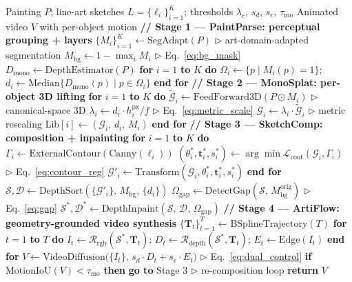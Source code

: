 \begin{algorithm}[t]
\caption{Canvas3D Pipeline}
\label{alg:canvas3d}
{\footnotesize
\begin{algorithmic}[1]
\REQUIRE Painting $P$; line-art sketches $L=\{\ell_i\}_{i=1}^{K}$;
         thresholds $\lambda_c$, $s_d$, $s_e$, $\tau_\text{mo}$
\ENSURE Animated video $V$ with per-object motion
\medskip
\STATE \textbf{// Stage 1 --- PaintParse: perceptual grouping + layers}
\STATE $\{M_i\}_{i=1}^{K} \gets \text{SegAdapt}(P)$
    \hfill $\triangleright$ art-domain-adapted segmentation
\STATE $M_\text{bg} \gets 1 - \max_i M_i$
    \hfill $\triangleright$ Eq.~\ref{eq:bg_mask}
\STATE $D_\text{mono} \gets \text{DepthEstimator}(P)$
\STATE \textbf{for} $i = 1$ \textbf{to} $K$ \textbf{do}
\STATE \quad $\Omega_i \gets \{p \mid M_i(p){=}1\}$;
    $d_i \gets \text{Median}\{D_\text{mono}(p) \mid p \in \Omega_i\}$
\STATE \textbf{end for}
\medskip
\STATE \textbf{// Stage 2 --- MonoSplat: per-object 3D lifting}
\STATE \textbf{for} $i = 1$ \textbf{to} $K$ \textbf{do}
\STATE \quad $\widetilde{\mathcal{G}}_i \gets
    \text{FeedForward3D}(P \odot M_i)$
    \hfill $\triangleright$ canonical-space 3D
\STATE \quad $\lambda_i \gets d_i \cdot h_i^\text{px}/f$
    \hfill $\triangleright$ Eq.~\ref{eq:metric_scale}
\STATE \quad $\mathcal{G}_i \gets \lambda_i \cdot \widetilde{\mathcal{G}}_i$
    \hfill $\triangleright$ metric rescaling
\STATE \quad $\text{Lib}[i] \gets (\mathcal{G}_i,\, d_i,\, M_i)$
\STATE \textbf{end for}
\medskip
\STATE \textbf{// Stage 3 --- SketchComp: composition + inpainting}
\STATE \textbf{for} $i = 1$ \textbf{to} $K$ \textbf{do}
\STATE \quad $\Gamma_i \gets \text{ExternalContour}(\text{Canny}(\ell_i))$
\STATE \quad $(\theta_i^*,\mathbf{t}_i^*,s_i^*) \gets
    \arg\min \mathcal{L}_\text{cont}(\mathcal{G}_i,\Gamma_i)$
    \hfill $\triangleright$ Eq.~\ref{eq:contour_reg}
\STATE \quad $\mathcal{G}'_i \gets
    \text{Transform}(\mathcal{G}_i,\theta_i^*,\mathbf{t}_i^*,s_i^*)$
\STATE \textbf{end for}
\STATE $\mathcal{S},\mathcal{D} \gets
    \text{DepthSort}(\{\mathcal{G}'_i\},\,M_\text{bg},\,\{d_i\})$
\STATE $\Omega_\text{gap} \gets
    \text{DetectGap}(\mathcal{S},\,M_\text{bg}^\text{orig})$
    \hfill $\triangleright$ Eq.~\ref{eq:gap}
\STATE $\mathcal{S}^*,\mathcal{D}^* \gets
    \text{DepthInpaint}(\mathcal{S},\,\mathcal{D},\,\Omega_\text{gap})$
\medskip
\STATE \textbf{// Stage 4 --- ArtiFlow: geometry-grounded video synthesis}
\STATE $\{\mathbf{T}_t\}_{t=1}^{T} \gets \text{BSplineTrajectory}(T)$
\STATE \textbf{for} $t = 1$ \textbf{to} $T$ \textbf{do}
\STATE \quad $I_t \gets \mathcal{R}_\text{rgb}(\mathcal{S}^*,\mathbf{T}_t)$;
\STATE \quad $D_t \gets \mathcal{R}_\text{depth}(\mathcal{S}^*,\mathbf{T}_t)$;
\STATE \quad $E_t \gets \text{Edge}(I_t)$
\STATE \textbf{end for}
\STATE $V \gets \text{VideoDiffusion}\bigl(\{I_t\},\,s_d\!\cdot\!D_t
    + s_e\!\cdot\!E_t\bigr)$
    \hfill $\triangleright$ Eq.~\ref{eq:dual_control}
\STATE \textbf{if} $\text{MotionIoU}(V) < \tau_\text{mo}$ \textbf{then}
    \quad \textbf{go to} Stage 3
    \hfill $\triangleright$ re-composition loop
\STATE \textbf{return} $V$
\end{algorithmic}}
\end{algorithm}
